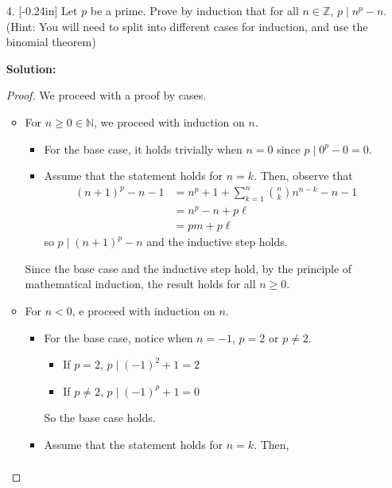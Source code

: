 \documentclass[letterpaper,12pt]{article}
\theoremstyle{definition}
\begin{document}
\begin{enumerate}
    \item[4.] \reversemarginpar{}[-0.24in] Let $p$ be a prime. Prove by induction that for all $n \in \mathbb{Z}$, $p \mid n^p - n$. (Hint: You will need to split into different cases for induction, and use the binomial theorem)
    \begin{mdframed}
         \textbf{Solution:}
         \begin{proof}
             We proceed with a proof by cases.
             \begin{itemize}
                 \item For $n \geq 0 \in \mathbb{N}$, we proceed with induction on $n$. \begin{itemize}
                     \item For the base case, it holds trivially when $n=0$ since $p \mid 0^p - 0 = 0$.
                     \item Assume that the statement holds for $n=k$. Then, observe that \begin{align*}
                         (n+1)^{p} - n - 1 &= n^p + 1 + \sum_{k=1}^{n}{n \choose k} n^{n-k} -n-1\\
                     &= n^p - n + p\ell \\
                     &= pm + p\ell
                     \end{align*}
                     so $p \mid (n+1)^p - n$ and the inductive step holds.
                 \end{itemize}
                 Since the base case and the inductive step hold, by the principle of mathematical induction, the result holds for all $n \geq 0$.
                 \item For $n < 0$, e proceed with induction on $n$. \begin{itemize}
                     \item For the base case, notice when $n = -1$, $p = 2$ or $p \neq 2$. \begin{itemize}
                         \item If $p = 2$, $p \mid (-1)^2 + 1 = 2$ 
                         \item If $p \neq 2$, $p \mid (-1)^p + 1 = 0$
                     \end{itemize}
                     So the base case holds.
                     \item  Assume that the statement holds for $n=k$. Then, \begin{align*}

\end{align*}
\end{itemize}
\end{itemize}
\end{proof}
\end{mdframed}
\end{enumerate}
\end{document}
